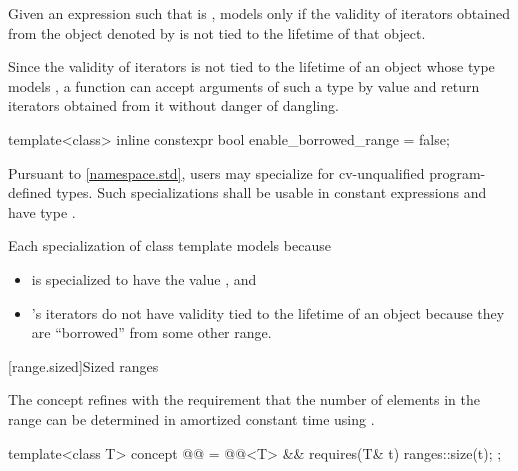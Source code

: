 \begin{itemdescr}
\pnum
Given an expression  such that  is ,
 models  only if
the validity of iterators obtained from the object denoted by 
is not tied to the lifetime of that object.

\pnum
\begin{note}
Since the validity of iterators is not tied to the lifetime of
an object whose type models ,
a function can accept arguments of such a type by value and
return iterators obtained from it without danger of dangling.
\end{note}
\end{itemdescr}

%
\begin{itemdecl}
template<class>
  inline constexpr bool enable_borrowed_range = false;
\end{itemdecl}

\begin{itemdescr}
\pnum
\remarks
Pursuant to \ref{namespace.std}, users may specialize 
for cv-unqualified program-defined types.
Such specializations shall be
usable in constant expressions and
have type .

\pnum
\begin{example}
Each specialization  of class template 
models  because
\begin{itemize}
\item
{} is specialized
to have the value , and

\item
{}'s iterators
do not have validity tied to the lifetime of an  object
because they are ``borrowed'' from some other range.
\end{itemize}
\end{example}
\end{itemdescr}

[range.sized]{Sized ranges}

\pnum
The  concept refines  with
the requirement that the number of elements in the range can be determined
in amortized constant time using .

\begin{itemdecl}
template<class T>
  concept @@ =
    @@<T> && requires(T& t) { ranges::size(t); };
\end{itemdecl}

